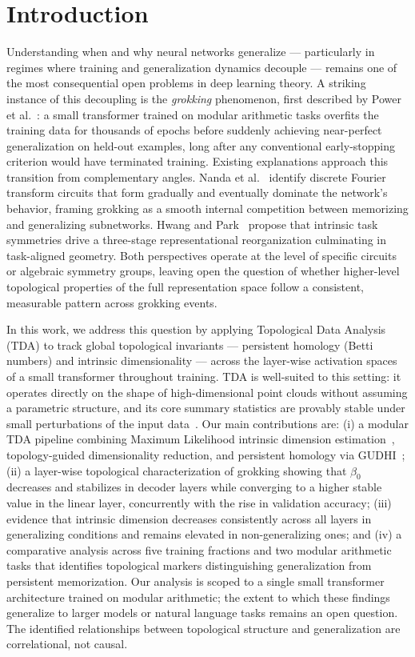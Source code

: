 \section{Introduction}
\label{sec:intro}

Understanding when and why neural networks generalize — particularly in
regimes where training and generalization dynamics decouple — remains one
of the most consequential open problems in deep learning theory. A
striking instance of this decoupling is the \emph{grokking} phenomenon,
first described by Power et al.~\cite{power2022grokking}: a small
transformer trained on modular arithmetic tasks overfits the training
data for thousands of epochs before suddenly achieving near-perfect
generalization on held-out examples, long after any conventional
early-stopping criterion would have terminated training. Existing
explanations approach this transition from complementary angles. Nanda
et al.~\cite{nanda2023progress} identify discrete Fourier transform
circuits that form gradually and eventually dominate the network's
behavior, framing grokking as a smooth internal competition between
memorizing and generalizing subnetworks. Hwang and
Park~\cite{hwang2026intrinsic} propose that intrinsic task symmetries
drive a three-stage representational reorganization culminating in
task-aligned geometry. Both perspectives operate at the level of
specific circuits or algebraic symmetry groups, leaving open the
question of whether higher-level topological properties of the full
representation space follow a consistent, measurable pattern across
grokking events.

In this work, we address this question by applying Topological Data
Analysis (TDA) to track global topological invariants — persistent
homology (Betti numbers) and intrinsic dimensionality — across the
layer-wise activation spaces of a small transformer throughout training.
TDA is well-suited to this setting: it operates directly on the shape
of high-dimensional point clouds without assuming a parametric structure,
and its core summary statistics are provably stable under small
perturbations of the input data~\cite{cohen2005stability}. Our main
contributions are: (i) a modular TDA pipeline combining Maximum
Likelihood intrinsic dimension estimation~\cite{levina2004maximum},
topology-guided dimensionality reduction, and persistent homology via
GUDHI~\cite{gudhi2025}; (ii) a layer-wise topological characterization
of grokking showing that $\beta_0$ decreases and stabilizes in decoder
layers while converging to a higher stable value in the linear layer,
concurrently with the rise in validation accuracy; (iii) evidence that
intrinsic dimension decreases consistently across all layers in
generalizing conditions and remains elevated in non-generalizing ones;
and (iv) a comparative analysis across five training fractions and two
modular arithmetic tasks that identifies topological markers
distinguishing generalization from persistent memorization. Our analysis
is scoped to a single small transformer architecture trained on modular
arithmetic; the extent to which these findings generalize to larger
models or natural language tasks remains an open question. The identified
relationships between topological structure and generalization are
correlational, not causal.